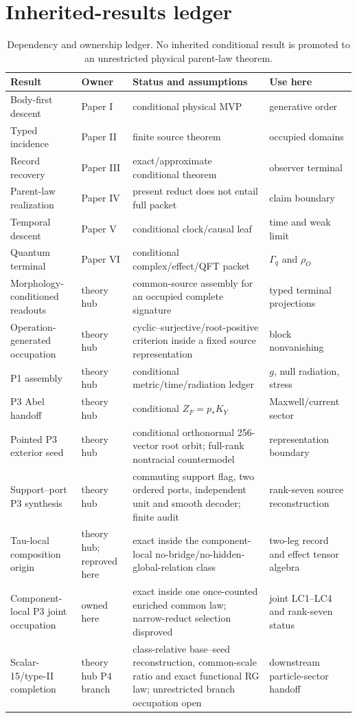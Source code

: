 \section{Inherited-results ledger}

\begin{table}[ht]
\centering\small
\begin{tabularx}{\textwidth}{@{}p{}p{}Xp{}@{}}
\toprule
Result & Owner & Status and assumptions & Use here\\
\midrule
Body-first descent & Paper I & conditional physical MVP & generative order\\
Typed incidence & Paper II & finite source theorem & occupied domains\\
Record recovery & Paper III & exact/approximate conditional theorem & observer terminal\\
Parent-law realization & Paper IV & present reduct does not entail full packet & claim boundary\\
Temporal descent & Paper V & conditional clock/causal leaf & time and weak limit\\
Quantum terminal & Paper VI & conditional complex/effect/QFT packet & $\Gamma_q$ and $\rho_O$\\
Morphology-conditioned readouts & theory hub & common-source assembly for an
occupied complete signature & typed terminal projections\\
Operation-generated occupation & theory hub & cyclic--surjective/root-positive criterion
inside a fixed source representation & block nonvanishing\\
P1 assembly & theory hub & conditional metric/time/radiation ledger & $g$, null radiation, stress\\
P3 Abel handoff & theory hub & conditional $Z_F=p_*K_Y$ & Maxwell/current sector\\
Pointed P3 exterior seed & theory hub & conditional orthonormal 256-vector
root orbit; full-rank nontracial countermodel & representation boundary\\
Support--port P3 synthesis & theory hub & commuting support flag, two ordered
ports, independent unit and smooth decoder; finite audit & rank-seven
source reconstruction\\
Tau-local composition origin & theory hub; reproved here & exact inside the
component-local no-bridge/no-hidden-global-relation class & two-leg record
and effect tensor algebra\\
Component-local P3 joint occupation & owned here & exact inside one
once-counted enriched common law; narrow-reduct selection disproved & joint
LC1--LC4 and rank-seven status\\
Scalar-15/type-II completion & theory hub P4 branch & class-relative
base--seed reconstruction, common-scale ratio and exact functional RG law;
unrestricted branch occupation open & downstream particle-sector handoff\\
\bottomrule
\end{tabularx}
\caption{Dependency and ownership ledger. No inherited conditional result is
promoted to an unrestricted physical parent-law theorem.}
\label{tab:dependencyledger}
\end{table}

